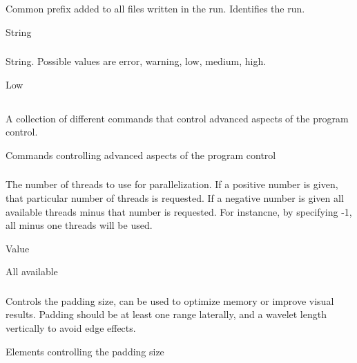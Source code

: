 \subsubsection{}
 \slist
   \item \Description Common prefix added to all files written in the run. Identifies the run.
   \item \Argument String
   \item \Default
 \elist

\subsubsection{}
 \slist
   \item \Description
   \item \Argument String. Possible values are error, warning, low, medium, high.
   \item \Default Low
 \elist

\subsection{} 
 \slist
   \item \Description A collection of different commands that control advanced aspects of the program control.
   \item \Argument Commands controlling advanced aspects of the program control
   \item \Default
 \elist

\subsubsection{}
 \slist
   \item \Description The number of threads to use for parallelization. If a positive number is
                      given, that particular number of threads is requested. If a negative number
                      is given all available threads minus that number is requested. For instancne,
                      by specifying -1, all minus one threads will be used.
   \item \Argument Value
   \item \Default All available
 \elist

\subsubsection{}
 \slist
   \item \Description Controls the padding size, can be used to optimize memory or improve visual results. Padding should be at least one range laterally, and a wavelet length vertically to avoid edge effects.
   \item \Argument Elements controlling the padding size
   \item \Default
 \elist

